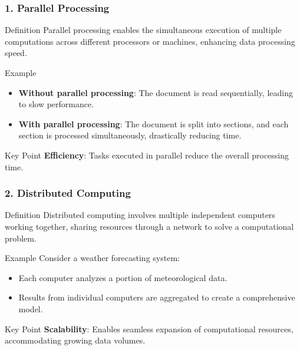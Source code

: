 \documentclass[aspectratio=169]{beamer}
\begin{document}
\begin{frame}[fragile]
    \frametitle{1. Parallel Processing}
    \begin{block}{Definition}
        Parallel processing enables the simultaneous execution of multiple computations across different processors or machines, enhancing data processing speed.
    \end{block}
    
    \begin{block}{Example}
        \begin{itemize}
            \item \textbf{Without parallel processing}: The document is read sequentially, leading to slow performance.
            \item \textbf{With parallel processing}: The document is split into sections, and each section is processed simultaneously, drastically reducing time.
        \end{itemize}
    \end{block}

    \begin{block}{Key Point}
        \textbf{Efficiency}: Tasks executed in parallel reduce the overall processing time.
    \end{block}
\end{frame}

\begin{frame}[fragile]
    \frametitle{2. Distributed Computing}
    \begin{block}{Definition}
        Distributed computing involves multiple independent computers working together, sharing resources through a network to solve a computational problem.
    \end{block}
    
    \begin{block}{Example}
        Consider a weather forecasting system:
        \begin{itemize}
            \item Each computer analyzes a portion of meteorological data.
            \item Results from individual computers are aggregated to create a comprehensive model.
        \end{itemize}
    \end{block}

    \begin{block}{Key Point}
        \textbf{Scalability}: Enables seamless expansion of computational resources, accommodating growing data volumes.
    \end{block}
\end{frame}
\end{document}
